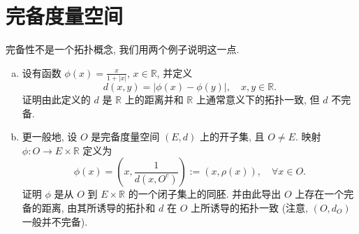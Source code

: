 \chapter{完备度量空间}
\thispagestyle{empty}



\begin{exercise}
    完备性不是一个拓扑概念, 我们用两个例子说明这一点.
    \begin{enumerate}[(a)]
      \item 设有函数 $\phi(x)=\frac{x}{1+|x|}$, $x\in\mathbb{R}$, 并定义
      \[d(x,y)=|\phi(x)-\phi(y)|,\quad x,y\in\mathbb{R}.\]
      证明由此定义的 $d$ 是 $\mathbb{R}$ 上的距离并和 $\mathbb{R}$ 上通常意义下的拓扑一致,
      但 $d$ 不完备.
      \item 更一般地, 设 $O$ 是完备度量空间 $(E,d)$ 上的开子集, 且 $O\neq E$.
      映射 $\phi:O\to E\times\mathbb{R}$ 定义为
      \[\phi(x)=\left(x,\frac{1}{d(x,O^c)}\right):=(x,\rho(x)),\quad\forall x\in O.\]
      证明 $\phi$ 是从 $O$ 到 $E\times\mathbb{R}$ 的一个闭子集上的同胚.
      并由此导出 $O$ 上存在一个完备的距离,
      由其所诱导的拓扑和 $d$ 在 $O$ 上所诱导的拓扑一致 (注意, $(O,d_O)$ 一般并不完备).
    \end{enumerate}
\end{exercise}

